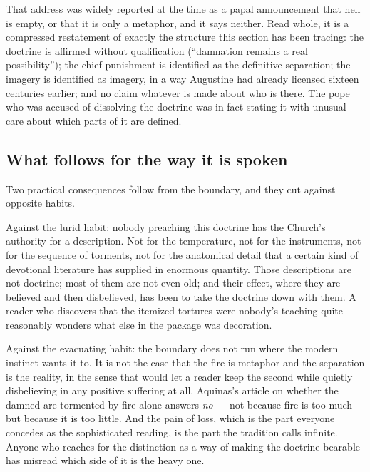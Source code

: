 That address was widely reported at the time as a papal announcement that hell is empty, or that it is only a metaphor, and it says neither. Read whole, it is a compressed restatement of exactly the structure this section has been tracing: the doctrine is affirmed without qualification (``damnation remains a real possibility''); the chief punishment is identified as the definitive separation; the imagery is identified as imagery, in a way Augustine had already licensed sixteen centuries earlier; and no claim whatever is made about who is there. The pope who was accused of dissolving the doctrine was in fact stating it with unusual care about which parts of it are defined.

\subsection{What follows for the way it is spoken}

Two practical consequences follow from the boundary, and they cut against opposite habits.

Against the lurid habit: nobody preaching this doctrine has the Church's authority for a description. Not for the temperature, not for the instruments, not for the sequence of torments, not for the anatomical detail that a certain kind of devotional literature has supplied in enormous quantity. Those descriptions are not doctrine; most of them are not even old; and their effect, where they are believed and then disbelieved, has been to take the doctrine down with them. A reader who discovers that the itemized tortures were nobody's teaching quite reasonably wonders what else in the package was decoration.

Against the evacuating habit: the boundary does not run where the modern instinct wants it to. It is not the case that the fire is metaphor and the separation is the reality, in the sense that would let a reader keep the second while quietly disbelieving in any positive suffering at all. Aquinas's article on whether the damned are tormented by fire alone answers \emph{no} --- not because fire is too much but because it is too little. And the pain of loss, which is the part everyone concedes as the sophisticated reading, is the part the tradition calls infinite. Anyone who reaches for the distinction as a way of making the doctrine bearable has misread which side of it is the heavy one.
